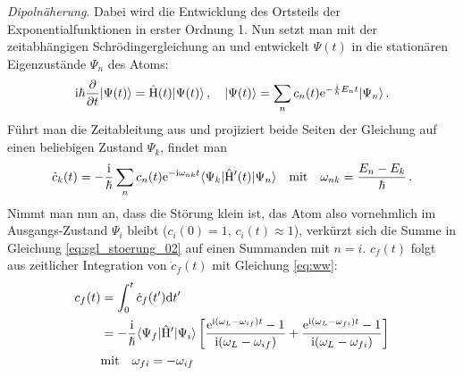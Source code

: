 \textit{Dipolnäherung}. Dabei wird die Entwicklung des Ortsteils der
Exponentialfunktionen in erster Ordnung 1. Nun setzt man mit der zeitabhängigen
Schrödingergleichung an und entwickelt $\Psi(t)$ in die stationären Eigenzustände $\Psi_n$ des Atoms:
\begin{equation}\label{eq:sgl_stoerung_01}
	\mathrm{i}\hbar\frac{\partial }{\partial t}|{\Psi(t)}\rangle=\hat{\mathrm{H}}(t)|{\Psi(t)}\rangle\,,
	\quad
	|{\Psi(t)}\rangle=\sum_n{c_n(t)\mathrm{e}^{-\frac{\mathrm{i}}{\hbar} E_n
	t}|{\Psi_n}\rangle}\,.
\end{equation}
Führt man die Zeitableitung aus und projiziert beide Seiten der Gleichung auf
einen beliebigen Zustand $\Psi_k$, findet man
\begin{equation}\label{eq:sgl_stoerung_02}
	\dot
	c_k(t)=-\frac{\mathrm{i}}{\hbar}\sum_n{c_n(t)\mathrm{e}^{-\mathrm{i}\omega_{nk}t}\langle{\Psi_k}|\hat{\mathrm{H}}'(t)|{\Psi_n}\rangle}
	\quad\text{mit}\quad
	\omega_{nk}=\frac{E_n-E_k}{\hbar}\,.
\end{equation}
Nimmt man nun an, dass die Störung klein ist, das Atom also vornehmlich im
Ausgangs-Zustand $\Psi_i$ bleibt ($c_i(0)=1$, $c_i(t)\approx 1$), verkürzt
sich die Summe in Gleichung \eqref{eq:sgl_stoerung_02} auf einen Summanden mit
$n=i$. $c_f(t)$ folgt aus zeitlicher Integration von $\dot c_f(t)$ mit
Gleichung \eqref{eq:ww}:
\begin{equation}\label{eq:koeff_cf}
	\begin{split}
		c_f(t) &= \int_0^t{\dot c_f(t')\mathrm{d} t'}\\
		&=
		-\frac{\mathrm{i}}{\hbar}\langle{\Psi_f}|\hat{\mathrm{H}}'|{\Psi_i}\rangle\left[\frac{\mathrm{e}^{\mathrm{i}(\omega_L-\omega_{if})t}-1}{\mathrm{i}(\omega_L-\omega_{if})}+\frac{\mathrm{e}^{\mathrm{i}(\omega_L-\omega_{fi})t}-1}{\mathrm{i}(\omega_L-\omega_{fi})}\right]\\
		&\text{mit}\quad
		\omega_{fi}=-\omega_{if}
	\end{split}
\end{equation}

